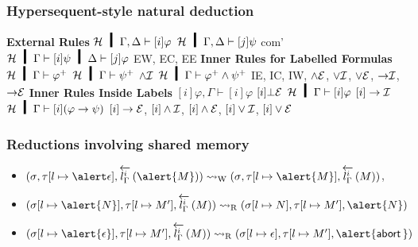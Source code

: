 \documentclass[slidestop,compress,mathserif]{beamer}
\begin{document}
\begin{frame}
 \frametitle{Hypersequent-style natural deduction}
 \small
  \textbf{External Rules}
   \vskip 2mm
   \BinaryRule
   {$\hyper\hmid\Gamma,\Delta\vdash[i]\varphi$}
   {$\hyper\hmid\Gamma,\Delta\vdash[j]\psi$}
   {com'}
   {$\hyper\hmid\Gamma\vdash[i]\psi\hmid\Delta\vdash[j]\varphi$}
  \hfill
   EW, EC, EE
 \vskip 2mm
\textbf{Inner Rules for Labelled Formulas}
\vskip 2mm
  \BinaryRule
   {$\hyper\hmid\Gamma\vdash \m\varphi$}
   {$\hyper\hmid\Gamma\vdash \m\psi$}
   {$\wedge\mathcal I$}
   {$\hyper\hmid\Gamma\vdash \m\varphi\wedge\m\psi$}
   \hfill
   IE, IC, IW,
   {$\wedge\mathcal E$},
   {$\vee\mathcal I$},
   {$\vee\mathcal E$},
   {$\mathord\rightarrow\mathcal I$},
   {$\mathord\rightarrow\mathcal E$}
\vskip 2mm
\textbf{Inner Rules Inside Labels}
\vskip 2mm
   {$[i]\varphi,\Gamma\vdash [i]\varphi$}
   \hfill
 \UnaryRule{$\hyper\hmid\Gamma\vdash[i]\bot$}
   {$[i]\bot\mathcal E$}
   {$\hyper\hmid\Gamma\vdash[i]\varphi$}
   \vskip 2mm
  \UnaryRule{$\hyper\hmid[i]\varphi,\Gamma\vdash [i]\psi$}
  {$[i]\rightarrow\mathcal I$}
  {$\hyper\hmid\Gamma\vdash [i](\varphi\rightarrow \psi)$}
  \hfill
  {$[i]\rightarrow\mathcal E$},
   {$[i]\wedge\mathcal I$},
   {$[i]\wedge\mathcal E$},
   {$[i]\vee\mathcal I$},
   {$[i]\vee\mathcal E$}
\end{frame}

 \begin{frame}
  \frametitle{Reductions involving shared memory}

 \begin{itemize}
  \item $\conf{}{[l\mapsto\alert\epsilon]}{\rtol i l \Gamma {\alert{M}}}
	\wreduce
	\conf{}{[l\mapsto \alert{M}]}{\rtol i l \Gamma M}
	$\enspace,
 \end{itemize}

  \begin{itemize}
   \item  $\conf{[l\mapsto \alert{N}]}{[l\mapsto M']}{\rtol i l\Gamma M}\rreduce
	  \conf{[l\mapsto {N}]}{[l\mapsto M']}{\alert{N}}$
   \item  $\conf{[l\mapsto \alert{\epsilon}]}
	  {[l\mapsto M']}{\rtol i l\Gamma M}\rreduce
	  \conf{[l\mapsto \epsilon]}{[l\mapsto M']}{\alert{\abort}}$
  \end{itemize}
  \vfill
 \end{frame}
\end{document}
